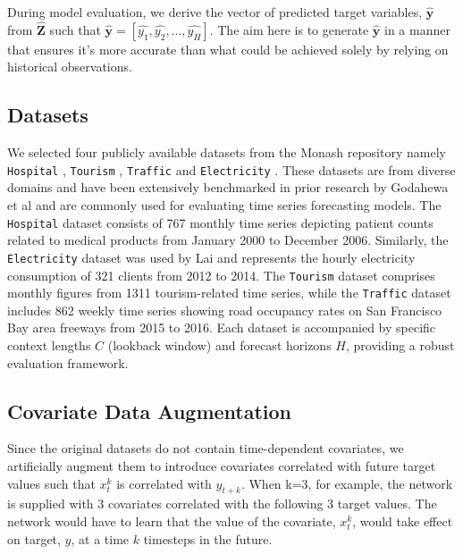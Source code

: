 \documentclass{article}
\newcommand{\horizon}{H}
\newcommand{\contextlength}{C}
\newcommand{\prediction}{\hat{\mathbf{Z}}}
\begin{document}
During model evaluation, we derive the vector of predicted target variables, $\mathbf{\hat{y}}$ from $\prediction$ such that $\mathbf{\hat{y}} = [\hat{y_1}, \hat{y_2}, \dots, \hat{y_\horizon}]$.
The aim here is to generate $\mathbf{\hat{y}}$ in a manner that ensures it's more accurate than what could be achieved solely by relying on historical observations.

\subsection{Datasets}
We selected four publicly available datasets from the Monash repository \cite{DBLP:conf/nips/GodahewaBWHM21} 
namely \texttt{Hospital} \cite{godahewa_2021_4656014}, \texttt{Tourism} \cite{godahewa_2021_4656096}, \texttt{Traffic} \cite{godahewa_2021_4656135} 
and \texttt{Electricity} \cite{godahewa_2021_4656140}. These datasets are from diverse domains and have 
been extensively benchmarked in prior research by Godahewa et al \cite{DBLP:conf/nips/GodahewaBWHM21} and are commonly used for evaluating time series 
forecasting models. The \texttt{Hospital} dataset consists of 767 monthly time series depicting patient counts related to 
medical products from January 2000 to December 2006. 
Similarly, the \texttt{Electricity} dataset was used by Lai \cite{lai2018modeling} and represents the hourly electricity 
consumption of 321 clients from 2012 to 2014. The \texttt{Tourism} dataset comprises monthly figures from 1311 tourism-related time series, 
while the \texttt{Traffic} dataset includes 862 weekly time series showing road occupancy rates on San 
Francisco Bay area freeways from 2015 to 2016. Each dataset is accompanied by specific context 
lengths $\contextlength$ (lookback window) and forecast horizons $\horizon$, providing a robust evaluation framework.

\subsection{Covariate Data Augmentation}
Since the original datasets do not contain time-dependent covariates, we artificially augment them 
to introduce covariates correlated with future target values such that $x_t^k$ is correlated with $y_{t+k}$.
When k=3, for example, the network is supplied with 3 covariates correlated with the following 3 target values. 
The network would have to learn that the value of the covariate, $x_t^k$, would take effect on target, $y$, at a time $k$ timesteps in the future. 
\end{document}
